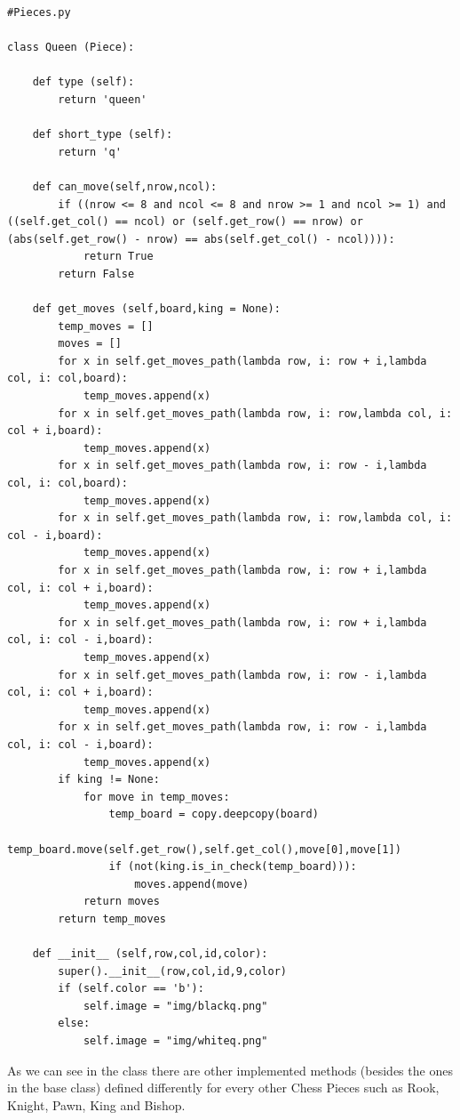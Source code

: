 \documentclass[english]{article}
\begin{document}
\begin{lstlisting}
#Pieces.py

class Queen (Piece):
    
    def type (self): 
        return 'queen'

    def short_type (self):
        return 'q'

    def can_move(self,nrow,ncol): 
        if ((nrow <= 8 and ncol <= 8 and nrow >= 1 and ncol >= 1) and ((self.get_col() == ncol) or (self.get_row() == nrow) or (abs(self.get_row() - nrow) == abs(self.get_col() - ncol)))):
            return True
        return False

    def get_moves (self,board,king = None):
        temp_moves = []
        moves = []
        for x in self.get_moves_path(lambda row, i: row + i,lambda col, i: col,board):
            temp_moves.append(x)
        for x in self.get_moves_path(lambda row, i: row,lambda col, i: col + i,board):
            temp_moves.append(x)
        for x in self.get_moves_path(lambda row, i: row - i,lambda col, i: col,board):
            temp_moves.append(x)
        for x in self.get_moves_path(lambda row, i: row,lambda col, i: col - i,board):
            temp_moves.append(x)
        for x in self.get_moves_path(lambda row, i: row + i,lambda col, i: col + i,board):
            temp_moves.append(x)
        for x in self.get_moves_path(lambda row, i: row + i,lambda col, i: col - i,board):
            temp_moves.append(x)
        for x in self.get_moves_path(lambda row, i: row - i,lambda col, i: col + i,board):
            temp_moves.append(x)
        for x in self.get_moves_path(lambda row, i: row - i,lambda col, i: col - i,board):
            temp_moves.append(x)
        if king != None:
            for move in temp_moves:
                temp_board = copy.deepcopy(board)
                temp_board.move(self.get_row(),self.get_col(),move[0],move[1])
                if (not(king.is_in_check(temp_board))):
                    moves.append(move)
            return moves
        return temp_moves

    def __init__ (self,row,col,id,color):
        super().__init__(row,col,id,9,color)
        if (self.color == 'b'):
            self.image = "img/blackq.png"
        else:
            self.image = "img/whiteq.png"
\end{lstlisting}

As we can see in the class there are other implemented methods (besides the ones in the base class) defined differently for every other Chess Pieces such as Rook, Knight, Pawn, King and Bishop.
\end{document}
